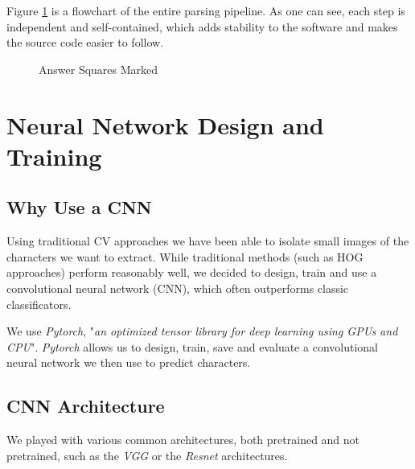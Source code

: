 \documentclass[11pt, a4paper]{report}
\begin{document}
Figure \ref{parsing-flow} is a flowchart of the entire parsing pipeline. As one can see, each step is independent and self-contained, which adds stability to the software and makes the source code easier to follow. 

\begin{figure}[!h]
	\centering
	\caption{Answer Squares Marked}
	\label{parsing-flow}
\end{figure}



\chapter{Neural Network Design and Training}

\section{Why Use a CNN}

Using traditional CV approaches we have been able to isolate small images of the characters we want to extract. While traditional methods (such as HOG\cite{HOG} approaches) perform reasonably well, we decided to design, train and use a convolutional neural network (CNN)\cite{CNN}, which often outperforms classic classificators.

We use \textit{Pytorch}, "\textit{an optimized tensor library for deep learning using GPUs and CPU}"\cite{pytorch}. \textit{Pytorch} allows us to design, train, save and evaluate a convolutional neural network we then use to predict characters.

\section{CNN Architecture}

We played with various common architectures, both pretrained and not pretrained, such as the \textit{VGG}\cite{VGG} or the \textit{Resnet}\cite{resnet} architectures.
\end{document}

